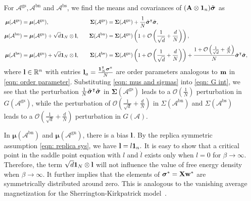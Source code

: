 \documentclass[9pt,twocolumn]{pnas-new}
\begin{document}
For $\mathcal{A}^{\text{gs}},\mathcal{A}^{\text{bn}}$ and $\mathcal{A}^{\text{bs}}$, we find the means and covariances of $(\mathbf{A} \otimes \bm{1}_n)\Tilde{\boldsymbol{\sigma}}$ as
\begin{equation}\label{eqn: mus and sigmas}
\begin{aligned}
\boldsymbol{\mu}(\mathcal{A}^{\text{gs}})&=\boldsymbol{\mu}(\mathcal{A}^{\text{gn}}),\quad &\boldsymbol{\Sigma}(\mathcal{A}^{\text{gs}})&= \boldsymbol{\Sigma}(\mathcal{A}^{\text{gn}})+\frac{1}{N}\Tilde{{\boldsymbol{\sigma}}}^{\intercal}\Tilde{{\boldsymbol{\sigma}}}, \\
\boldsymbol{\mu}(\mathcal{A}^{\text{bn}}) &=\boldsymbol{\mu}(\mathcal{A}^{\text{gn}}) +\sqrt{d} \boldsymbol{1}_N \otimes \mathbf{l},\quad &\boldsymbol{\Sigma}(\mathcal{A}^{\text{bn}})&=\boldsymbol{\Sigma}(\mathcal{A}^{\text{gn}})\left(1+\mathcal{O}\left(\frac{1}{\sqrt{d}}+\frac{d}{N}\right)\right),\\
\boldsymbol{\mu}(\mathcal{A}^{\text{bs}})&=\boldsymbol{\mu}(\mathcal{A}^{\text{gn}})+\sqrt{d} \boldsymbol{1}_N \otimes \mathbf{l} ,\quad &\boldsymbol{\Sigma}(\mathcal{A}^{\text{bs}})&=\boldsymbol{\Sigma}(\mathcal{A}^{\text{gn}})\left(1+\mathcal{O}\left(\frac{1}{\sqrt{d}}+\frac{d}{N}\right)\right)+\frac{1+\mathcal{O}\left(\frac{1}{\sqrt{d}}+\frac{d}{N}\right)}{N}\Tilde{{\boldsymbol{\sigma}}}^{\intercal}\Tilde{{\boldsymbol{\sigma}}},
\end{aligned}
\end{equation}
where $\mathbf{l} \in \mathbb{R}^{n}$ with entries $\mathbf{l}_a=\frac{\bm{1}_N^\intercal \boldsymbol{\sigma}^a}{N}$ are order parameters analogous to $\mathbf{m}$ in \eqref{eqn: order parameter}.  
Substituting \eqref{eqn: mus and sigmas} into \eqref{eqn: G int}, we see that the perturbation $\frac{1}{N}\Tilde{{\boldsymbol{\sigma}}}^{\intercal}\Tilde{{\boldsymbol{\sigma}}}$ in $\boldsymbol{\Sigma}(\mathcal{A}^{\text{gs}})$ leads to a $\mathcal{O}(\frac{1}{N})$ perturbation in $G(\mathcal{A}^{\text{gs}})$, while the perturbation of $\mathcal{O}\left(\frac{1}{\sqrt{d}}+\frac{d}{N}\right)$ in $\Sigma(\mathcal{A}^{\text{bn}})$ and $\Sigma(\mathcal{A}^{\text{bs}})$ leads to a $\mathcal{O}(\frac{1}{\sqrt{d}}+\frac{d}{N})$ perturbation in $G(\mathcal{A})$. 

In $\boldsymbol{\mu}(\mathcal{A}^{\text{bn}})$ and $\boldsymbol{\mu}(\mathcal{A}^{\text{gn}})$, there is a bias $\mathbf{l}$. By the replica symmetric assumption \eqref{eqn: replica sys}, we have
$
    \mathbf{l} = l \boldsymbol{1}_n.
$
It is easy to show that a critical point in the saddle point equation with $l$ and $\hat{l}$ exists only when $l=0$ for $\beta \to \infty$. Therefore, the term $\sqrt{d}\boldsymbol{1}_N\otimes\mathbf{l}$ will not influence the value of free energy density when $\beta \to \infty$. It further implies that the elements of $\boldsymbol{\sigma}^*=\mathbf{X}\mathbf{w}^*$ are symmetrically distributed around zero.  This is analogous to the vanishing average magnetization for the Sherrington-Kirkpatrick model~\cite{mezard1987spin}. 
\end{document}
